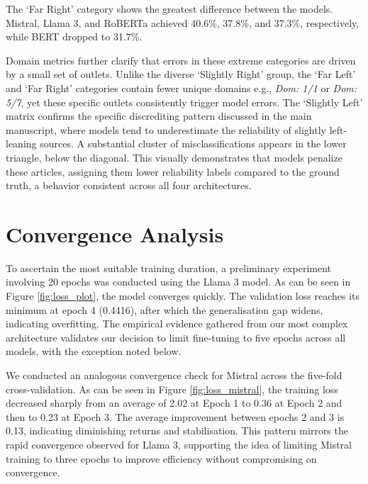 \documentclass[11pt,a4paper]{article}
\begin{document}
The `Far Right' category shows the greatest difference between the models. Mistral, Llama 3, and RoBERTa achieved 40.6\%, 37.8\%, and 37.3\%, respectively, while BERT dropped to 31.7\%.

Domain metrics further clarify that errors in these extreme categories are driven by a small set of outlets. Unlike the diverse `Slightly Right' group, the `Far Left' and `Far Right' categories contain fewer unique domains e.g., \textit{Dom: 1/1} or \textit{Dom: 5/7}, yet these specific outlets consistently trigger model errors.
The `Slightly Left' matrix confirms the specific discrediting pattern discussed in the main manuscript, where models tend to underestimate the reliability of slightly left-leaning sources.
A substantial cluster of misclassifications appears in the lower triangle, below the diagonal. This visually demonstrates that models penalize these articles, assigning them lower reliability labels compared to the ground truth, a behavior consistent across all four architectures.


\section{Convergence Analysis}
\label{app:convergence}
To ascertain the most suitable training duration, a preliminary experiment involving 20 epochs was conducted using the Llama 3 model. As can be seen in Figure \ref{fig:loss_plot}, the model converges quickly. The validation loss reaches its minimum at epoch 4 (0.4416), after which the generalisation gap widens, indicating overfitting. The empirical evidence gathered from our most complex architecture validates our decision to limit fine-tuning to five epochs across all models, with the exception noted below.

We conducted an analogous convergence check for Mistral across the five-fold cross-validation. As can be seen in Figure \ref{fig:loss_mistral}, the training loss decreased sharply from an average of 2.02 at Epoch 1 to 0.36 at Epoch 2 and then to 0.23 at Epoch 3. The average improvement between epochs 2 and 3 is 0.13, indicating diminishing returns and stabilisation. This pattern mirrors the rapid convergence observed for Llama 3, supporting the idea of limiting Mistral training to three epochs to improve efficiency without compromising on convergence.
\end{document}

